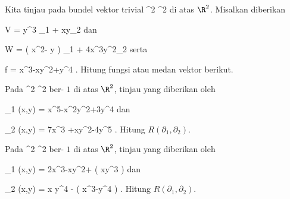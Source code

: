 \setcounter{section}{28}


{}
{

Kita tinjau
pada bundel vektor trivial
\maabbdisp {} {\R^2 \times \R } { \R^2
} {}
di atas $\R^2$. Misalkan diberikan

\mavergleichskettedisp
{\vergleichskette
{ V
}
{ =} { y^3 \partial_1 + xy\partial_2
}
{ } {
}
{ } {
}
{ } {
}
}
{}{}{}
dan

\mavergleichskettedisp
{\vergleichskette
{ W
}
{ =} { \left(  x^2- y  \right)  \partial_1 + 4x^3y^2\partial_2
}
{ } {
}
{ } {
}
{ } {
}
}
{}{}{}
serta

\mavergleichskettedisp
{\vergleichskette
{ f
}
{ =} { x^3-xy^2+y^4
}
{ } {
}
{ } {
}
{ } {
}
}
{}{}{.}
Hitung fungsi atau medan vektor berikut.

}
{} {}

{}
{

Pada
 {\R^2 \times \R} { \R^2
} {}
ber-
$1$ di atas $\R^2$, tinjau
yang diberikan oleh

\mavergleichskette
{\vergleichskette
{ \Gamma_1 (x,y)
}
{ = }{ x^5-x^2y^2+3y^4
}
{  }{
}
{    }{
}
{   }{
}
}
{}{}{}
dan

\mavergleichskette
{\vergleichskette
{ \Gamma_2 (x,y)
}
{ = }{ 7x^3 +xy^2-4y^5
}
{  }{
}
{    }{
}
{   }{
}
}
{}{}{.}
Hitung
$R \left(  \partial_1, \partial_2  \right)$.

}
{} {}

{}
{

Pada
 {\R^2 \times \R} { \R^2
} {}
ber-
$1$ di atas $\R^2$, tinjau
yang diberikan oleh

\mavergleichskette
{\vergleichskette
{ \Gamma_1 (x,y)
}
{ = }{ 2x^3-xy^2+  \sinh  \left(  xy^3  \right)
}
{  }{
}
{    }{
}
{   }{
}
}
{}{}{}
dan

\mavergleichskette
{\vergleichskette
{ \Gamma_2 (x,y)
}
{ = }{ x y^4 -   \exp  \left(  x^3-y^4 \right)
}
{  }{
}
{    }{
}
{   }{
}
}
{}{}{.}
Hitung
$R \left(  \partial_1, \partial_2  \right)$.

}
{} {}

